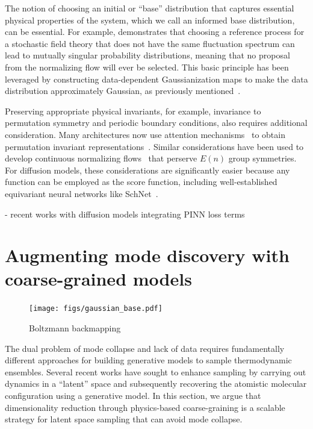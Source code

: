 \documentclass[11pt]{article}
\begin{document}
The notion of choosing an initial or ``base'' distribution that captures essential physical properties of the system, which we call an informed base distribution, can be essential. 
For example, \cite{gabrie_adaptive_2022} demonstrates that choosing a reference process for a stochastic field theory that does not have the same fluctuation spectrum can lead to mutually singular probability distributions, meaning that no proposal from the normalizing flow will ever be selected.
This basic principle has been leveraged by constructing data-dependent Gaussianization maps to make the data distribution approximately Gaussian, as previously mentioned~\cite{noe_boltzmann_2019}.

Preserving appropriate physical invariants, for example, invariance to permutation symmetry and periodic boundary conditions, also requires additional consideration.
Many architectures now use attention mechanisms~\cite{vaswani_attention_2017} to obtain permutation invariant representations~\cite{wirnsberger_targeted_2020}.
Similar considerations have been used to develop continuous normalizing flows~\cite{satorras_en_2021-1} that perserve $E(n)$ group symmetries. 
For diffusion models, these considerations are significantly easier because any function can be employed as the score function, including well-established equivariant neural networks like SchNet~\cite{schutt_schnet_2018}. 

- recent works with diffusion models integrating PINN loss terms

\section{Augmenting mode discovery with coarse-grained models}\label{sec:nfphys}

\begin{figure}
    \centering
    \texttt{[image: figs/gaussian\_base.pdf]}
    \caption{Boltzmann backmapping}
    \label{fig:enter-label}
\end{figure}

The dual problem of mode collapse and lack of data requires fundamentally different approaches for building generative models to sample thermodynamic ensembles.
Several recent works have sought to enhance sampling by carrying out dynamics in a ``latent'' space and subsequently recovering the atomistic molecular configuration using a generative model.
In this section, we argue that dimensionality reduction through physics-based coarse-graining is a scalable strategy for latent space sampling that can avoid mode collapse.
\end{document}
